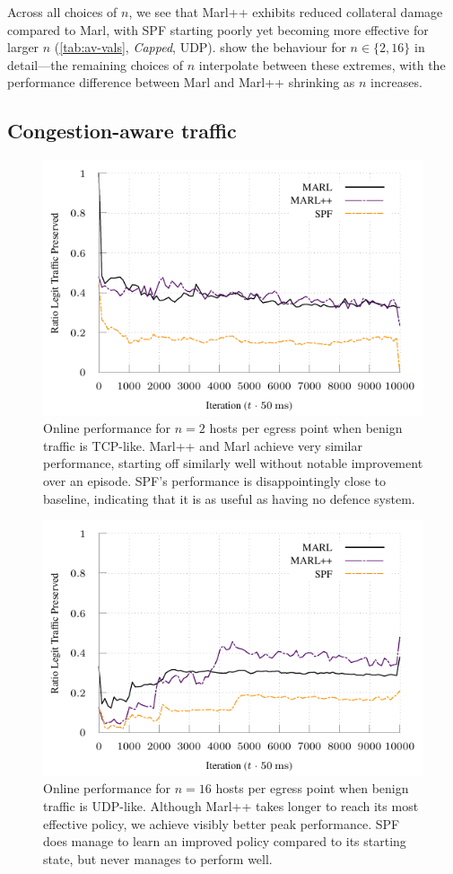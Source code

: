 \documentclass[conference, letterpaper, 10pt, times]{IEEEtran}
\begin{document}
Across all choices of $n$, we see that Marl++ exhibits reduced collateral damage compared to Marl, with SPF starting poorly yet becoming more effective for larger $n$ (\cref{tab:av-vals}, \emph{Capped}, UDP).
 show the behaviour for $n \in \{2, 16\}$ in detail---the remaining choices of $n$ interpolate between these extremes, with the performance difference between Marl and Marl++ shrinking as $n$ increases.

\subsection{Congestion-aware traffic}
\begin{figure}
	\centering
	\includegraphics[width=0.9\linewidth]{../plots/tcp-2}
	
	\caption{
		Online performance for $n=2$ hosts per egress point when benign traffic is TCP-like.
		Marl++ and Marl achieve very similar performance, starting off similarly well without notable improvement over an episode.
		SPF's performance is disappointingly close to baseline, indicating that it is as useful as having no defence system.
		\label{fig:tcp-2}
	}
\end{figure}
\begin{figure}
	\centering
	\includegraphics[width=0.9\linewidth]{../plots/tcp-16}
	
	\caption{
		Online performance for $n=16$ hosts per egress point when benign traffic is UDP-like.
		Although Marl++ takes longer to reach its most effective policy, we achieve visibly better peak performance.
		SPF does manage to learn an improved policy compared to its starting state, but never manages to perform well.
		\label{fig:tcp-16}
	}
\end{figure}
\end{document}
